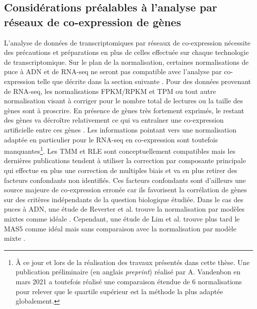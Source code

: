 \subsection{Considérations préalables à l'analyse par réseaux de co-expression de gènes}

L'analyse de données de transcriptomiques par réseaux de co-expression nécessite des précautions et préparations en plus de celles effectuée sur chaque technologie de transcriptomique. Sur le plan de la normalisation, certaines normalisations de puce à ADN et de RNA-seq ne seront pas compatible avec l'analyse par co-expression telle que décrite dans la section suivante \cite{Zhang2005a}. Pour des données provenant de RNA-seq, les normalisations FPKM/RPKM et TPM ou tout autre normalisation visant à corriger pour le nombre total de lectures ou la taille des gènes sont à proscrire. En présence de gènes très fortement exprimés, le restant des gènes va décroître relativement ce qui va entraîner une co-expression artificielle entre ces gènes \cite{Spiko2017thesis}. Les informations pointant vers une normalisation adaptée en particulier pour le RNA-seq en co-expression sont toutefois manquantes\footnote{À ce jour et lors de la réalisation des travaux présentés dans cette thèse. Une publication préliminaire (en anglais \textit{preprint}) réalisé par A. Vandenbon en mars 2021 \cite{Vandenbon2021Mar} a toutefois réalisé une comparaison étendue de 6 normalisations pour relever que le quartile supérieur est la méthode la plus adaptée globalement.}. Les TMM et RLE sont conceptuellement compatibles mais les dernières publications tendent à utiliser la correction par composante principale \cite{Parsana2019} qui effectue en plus une correction de multiples biais et va en plus retirer des facteurs confondants non identifiés. Ces facteurs confondants sont d'ailleurs une source majeure de co-expression erronée car ils favorisent la corrélation de gènes sur des critères indépendants de la question biologique étudiée. Dans le cas des puces à ADN, une étude de Reverter et al. trouve la normalisation par modèles mixtes comme idéale \cite{Reverter2005Apr}. Cependant, une étude de Lim et al. trouve plus tard le MAS5 comme idéal mais sans comparaison avec la normalisation par modèle mixte \cite{Lim2007Jul}.

